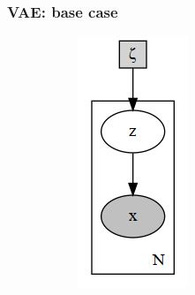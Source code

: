 \documentclass[final]{beamer}
\theoremstyle{plain}
\theoremstyle{definition}
\theoremstyle{remark}
\begin{document}
\begin{frame}
\frametitle{VAE: base case}

\begin{figure}[h]
\centering
\begin{subfigure}[b]{0.2\textwidth}
\includegraphics[width=\textwidth]{plots/vae_p.gv.png}

\end{subfigure}
\end{figure}
\end{frame}
\end{document}
